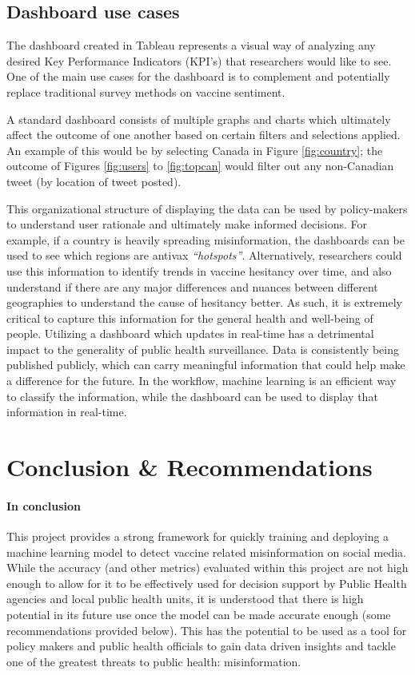 \documentclass[12pt]{article}
\begin{document}
\subsection{Dashboard use cases}
The dashboard created in Tableau represents a visual way of analyzing any desired Key Performance Indicators (KPI’s) that researchers would like to see. One of the main use cases for the dashboard is to complement and potentially replace traditional survey methods on vaccine sentiment. \newline

A standard dashboard consists of multiple graphs and charts which ultimately affect the outcome of one another based on certain filters and selections applied. An example of this would be by selecting Canada in Figure \ref{fig:country}; the outcome of Figures \ref{fig:users} to \ref{fig:topcan}  would filter out any non-Canadian tweet (by location of tweet posted).

This organizational structure of displaying the data can be used by policy-makers to understand user rationale and ultimately make informed decisions.  For example, if a country is heavily spreading misinformation, the dashboards can be used to see which regions are antivax \textit{“hotspots”}.  Alternatively, researchers could use this information to identify trends in vaccine hesitancy over time, and also understand if there are any major differences and nuances between different geographies to understand the cause of hesitancy better.  As such, it is extremely critical to capture this information for the general health and well-being of people. \newline
Utilizing a dashboard which updates in real-time has a detrimental impact to the generality of public health surveillance.  Data is consistently being published publicly, which can carry meaningful information that could help make a difference for the future.  In the workflow, machine learning  is an efficient way to classify the information, while the dashboard can be used to display that information in real-time.

\newpage
\section{Conclusion \& Recommendations}
\paragraph{In conclusion} This project provides a strong framework for quickly training and deploying a machine learning model to detect vaccine related misinformation on social media. While the accuracy (and other metrics) evaluated within this project are not high enough to allow for it to be effectively used for decision support by Public Health agencies and local public health units, it is understood that there is high potential in its future use once the model can be made accurate enough (some recommendations provided below). This has the potential to be used as a tool for policy makers and public health officials to gain data driven insights and tackle one of the greatest threats to public health: misinformation. \newline
\end{document}

